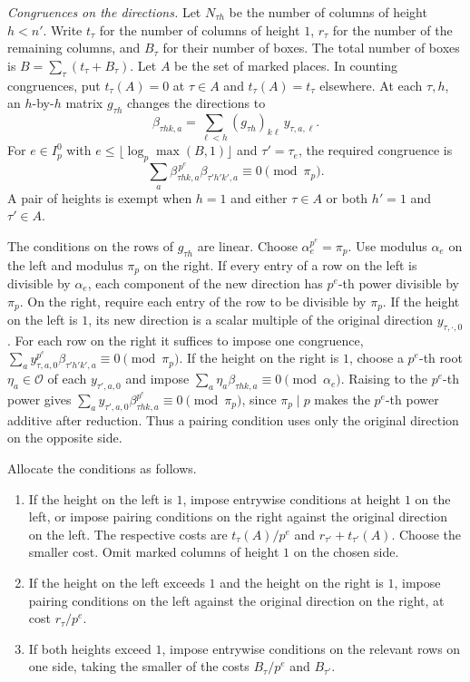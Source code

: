 \emph{Congruences on the directions.}
Let \(N_{\tau h}\) be the number of columns of height \(h<n'\).
Write \(t_\tau\) for the number of columns of height \(1\),
\(r_\tau\) for the number of the remaining columns, and \(B_\tau\) for
their number of boxes. The total number of boxes is
\(B=\sum_\tau(t_\tau+B_\tau)\). Let \(A\) be the set of marked places.
In counting congruences, put \(t_\tau(A)=0\) at \(\tau\in A\) and
\(t_\tau(A)=t_\tau\) elsewhere.
At each \(\tau,h\), an \(h\)-by-\(h\) matrix \(g_{\tau h}\) changes the
directions to
\[
 \beta_{\tau h k,a}=\sum_{\ell<h}(g_{\tau h})_{k\ell}\,y_{\tau,a,\ell}.
\]
For \(e\in I_p^0\) with \(e\le\lfloor\log_p\max(B,1)\rfloor\) and
\(\tau'=\tau_e\), the required congruence is
\begin{equation}\label{eq:upper-direction-pairing}
 \sum_a\beta_{\tau h k,a}^{\,p^e}\beta_{\tau' h' k',a}\equiv 0
   \pmod{\pi_p}.
\end{equation}
A pair of heights is exempt when \(h=1\) and either \(\tau\in A\)
or both \(h'=1\) and \(\tau'\in A\).

The conditions on the rows of \(g_{\tau h}\) are linear.
Choose \(\alpha_e^{p^e}=\pi_p\). Use modulus \(\alpha_e\) on the left
and modulus \(\pi_p\) on the right. If every entry of a row on the
left is divisible by \(\alpha_e\), each component of the new direction
has \(p^e\)-th power divisible by \(\pi_p\).
On the right, require each entry of the row to be divisible by \(\pi_p\).
If the height on the left is \(1\), its new direction is a scalar
multiple of the original direction \(y_{\tau,\cdot,0}\).
For each row on the right it suffices to impose one congruence,
\(\sum_a y_{\tau,a,0}^{p^e}\beta_{\tau' h' k',a}\equiv0\pmod{\pi_p}\).
If the height on the right is \(1\), choose a \(p^e\)-th root
\(\eta_a\in\mathcal O\) of each \(y_{\tau',a,0}\) and impose
\(\sum_a\eta_a\beta_{\tau h k,a}\equiv0\pmod{\alpha_e}\).
Raising to the \(p^e\)-th power gives
\(\sum_a y_{\tau',a,0}\beta_{\tau h k,a}^{p^e}\equiv0\pmod{\pi_p}\),
since \(\pi_p\mid p\) makes the \(p^e\)-th power additive after reduction.
Thus a pairing condition uses only the original direction on the
opposite side.

Allocate the conditions as follows.

\begin{enumerate}
\item If the height on the left is \(1\), impose entrywise conditions
at height \(1\) on the left, or impose pairing conditions on the right
against the original direction on the left. The respective costs are
\(t_\tau(A)/p^e\) and \(r_{\tau'}+t_{\tau'}(A)\). Choose the smaller cost.
Omit marked columns of height \(1\) on the chosen side.
\item If the height on the left exceeds \(1\) and the height on the
right is \(1\), impose pairing conditions on the left against the
original direction on the right, at cost \(r_\tau/p^e\).
\item If both heights exceed \(1\), impose entrywise conditions on the
relevant rows on one side, taking the smaller of the costs
\(B_\tau/p^e\) and \(B_{\tau'}\).
\end{enumerate}


